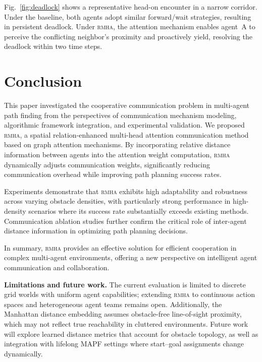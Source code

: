 \documentclass[sigconf]{acmart}
\newcommand{\rmha}{\textsc{rmha}}
\begin{document}
Fig.~\ref{fig:deadlock} shows a representative head-on encounter
in a narrow corridor.
Under the baseline, both agents adopt similar forward/wait
strategies, resulting in persistent deadlock.
Under \rmha, the attention mechanism enables agent~A to perceive
the conflicting neighbor's proximity and proactively yield,
resolving the deadlock within two time steps.

\section{Conclusion}

This paper investigated the cooperative communication problem in
multi-agent path finding from the perspectives of communication
mechanism modeling, algorithmic framework integration, and
experimental validation.
We proposed \rmha, a spatial relation-enhanced multi-head attention
communication method based on graph attention mechanisms.
By incorporating relative distance information between agents into
the attention weight computation, \rmha{} dynamically adjusts
communication weights, significantly reducing communication
overhead while improving path planning success rates.

Experiments demonstrate that \rmha{} exhibits high adaptability
and robustness across varying obstacle densities, with
particularly strong performance in high-density scenarios where
its success rate substantially exceeds existing methods.
Communication ablation studies further confirm the critical role of
inter-agent distance information in optimizing path planning
decisions.

In summary, \rmha{} provides an effective solution for efficient
cooperation in complex multi-agent environments, offering a new
perspective on intelligent agent communication and collaboration.

\textbf{Limitations and future work.}
The current evaluation is limited to discrete grid worlds with
uniform agent capabilities; extending \rmha{} to continuous action
spaces and heterogeneous agent teams remains open.
Additionally, the Manhattan distance embedding assumes obstacle-free
line-of-sight proximity, which may not reflect true reachability in
cluttered environments.
Future work will explore learned distance metrics that account for
obstacle topology, as well as integration with lifelong MAPF
settings where start--goal assignments change dynamically.
\end{document}
